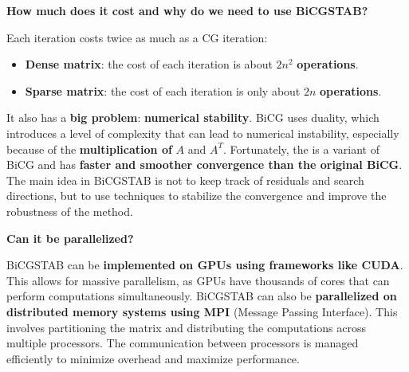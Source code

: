 \begin{flushleft}
    \textcolor{Red2}{ \textbf{How much does it cost and why do we need to use BiCGSTAB?}}
\end{flushleft}
Each iteration costs twice as much as a CG iteration:
\begin{itemize}
    \item \textbf{Dense matrix}: the cost of each iteration is about $2n^{2}$ \textbf{operations}.
    \item \textbf{Sparse matrix}: the cost of each iteration is only about $2n$ \textbf{operations}.
\end{itemize}
It also has a \textbf{big problem}: \textbf{numerical stability}. BiCG uses duality, which introduces a level of complexity that can lead to numerical instability, especially because of the \textbf{multiplication of} $A$ and $A^{T}$. Fortunately, the  is a variant of BiCG and has \textbf{faster and smoother convergence than the original BiCG}. The main idea in BiCGSTAB is not to keep track of residuals and search directions, but to use techniques to stabilize the convergence and improve the robustness of the method.

\highspace
\begin{flushleft}
    \textcolor{Green3}{ \textbf{Can it be parallelized?}}
\end{flushleft}
BiCGSTAB can be \textbf{implemented on GPUs using frameworks like CUDA}. This allows for massive parallelism, as GPUs have thousands of cores that can perform computations simultaneously. BiCGSTAB can also be \textbf{parallelized on distributed memory systems using MPI} (Message Passing Interface). This involves partitioning the matrix and distributing the computations across multiple processors. The communication between processors is managed efficiently to minimize overhead and maximize performance.